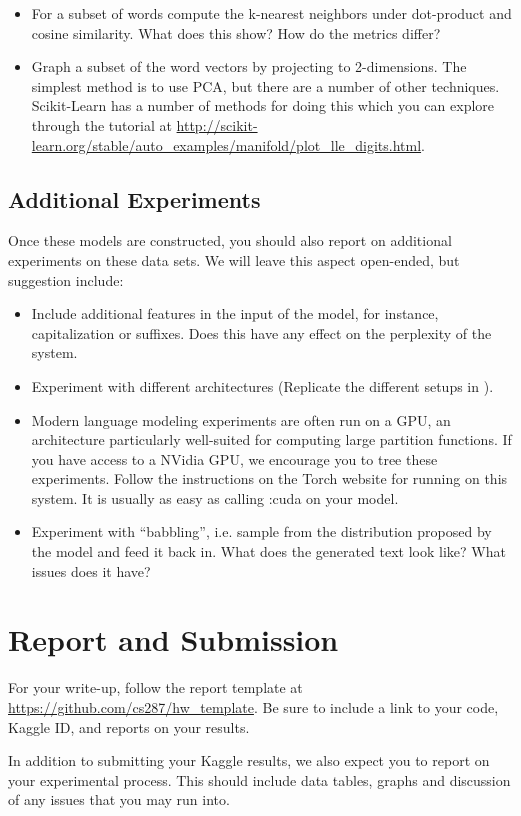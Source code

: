 \documentclass[11pt]{article}
\begin{document}
\begin{itemize}
\item For a subset of words compute the k-nearest neighbors under dot-product and
  cosine similarity. What does this show? How do the metrics differ?
\item Graph a subset of the word vectors by projecting to 2-dimensions.  The simplest method is to use PCA, but there are a number of other techniques. Scikit-Learn has a number of 
  methods for doing this which you can explore through the tutorial at \url{http://scikit-learn.org/stable/auto_examples/manifold/plot_lle_digits.html}.
\end{itemize}

\subsection{Additional Experiments}

Once these models are constructed, you should also report on
additional experiments on these data sets. We will leave this aspect
open-ended, but suggestion include:

\begin{itemize}
\item Include additional features in the input of the model, for instance, capitalization or suffixes. Does this have any effect on the perplexity of the system. 
\item Experiment with different architectures (Replicate the different setups in \cite{DBLP:journals/jmlr/BengioDVJ03}).
\item Modern language modeling experiments are often run on a GPU, an
  architecture particularly well-suited for computing large partition
  functions. If you have access to a NVidia GPU, we encourage you to
  tree these experiments. Follow the instructions on the Torch website for running on this 
  system. It is usually as easy as calling :cuda on your model.
\item Experiment with ``babbling'', i.e. sample from the distribution proposed by the model and 
feed it back in. What does the generated text look like? What issues does it have? 
\end{itemize}

\section{Report and Submission}

For your write-up, follow the report template at
\url{https://github.com/cs287/hw_template}. Be sure to include a link
to your code, Kaggle ID, and reports on your results.

In addition to submitting your Kaggle results, we also expect you to report on your 
experimental process. This should include data tables, graphs and discussion of any 
issues that you may run into. 

 

\end{document}
